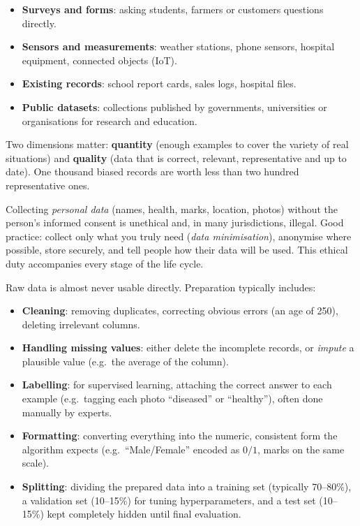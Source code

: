 \documentclass[11pt]{article}
\newcommand{\cle}[1]{{\popxbold\color{popdark}#1}}
\newcounter{popsec}
\newcounter{popsub}
\newcommand{\courssub}[1]{%
  \stepcounter{popsub}%
  \par\vspace{9pt}\noindent{\popxbold\fontsize{11.5}{13}\selectfont\color{popink}{\color{poporange}\thepopsec.\thepopsub}\hspace{6pt}#1}\par\nopagebreak\vspace{4pt}
}
\begin{document}
\begin{itemize}
\item \textbf{Surveys and forms}: asking students, farmers or customers questions directly.
\item \textbf{Sensors and measurements}: weather stations, phone sensors, hospital equipment, connected objects (IoT).
\item \textbf{Existing records}: school report cards, sales logs, hospital files.
\item \textbf{Public datasets}: collections published by governments, universities or organisations for research and education.
\end{itemize}

Two dimensions matter: \textbf{quantity} (enough examples to cover the variety of real situations) and \textbf{quality} (data that is correct, relevant, representative and up to date). One thousand biased records are worth less than two hundred representative ones.

\begin{attention}
Collecting \emph{personal data} (names, health, marks, location, photos) without the person's \cle{informed consent} is unethical and, in many jurisdictions, illegal. Good practice: collect only what you truly need (\emph{data minimisation}), anonymise where possible, store securely, and tell people how their data will be used. This ethical duty accompanies every stage of the life cycle.
\end{attention}

\courssub{Stage 3: Data Preparation}

Raw data is almost never usable directly. Preparation typically includes:

\begin{itemize}
\item \textbf{Cleaning}: removing duplicates, correcting obvious errors (an age of 250), deleting irrelevant columns.
\item \textbf{Handling missing values}: either delete the incomplete records, or \emph{impute} a plausible value (e.g.\ the average of the column).
\item \textbf{Labelling}: for supervised learning, attaching the correct answer to each example (e.g.\ tagging each photo ``diseased'' or ``healthy''), often done manually by experts.
\item \textbf{Formatting}: converting everything into the numeric, consistent form the algorithm expects (e.g.\ ``Male/Female'' encoded as $0/1$, marks on the same scale).
\item \textbf{Splitting}: dividing the prepared data into a \cle{training set} (typically 70--80\%), a \cle{validation set} (10--15\%) for tuning hyperparameters, and a \cle{test set} (10--15\%) kept completely hidden until final evaluation.
\end{itemize}
\end{document}
